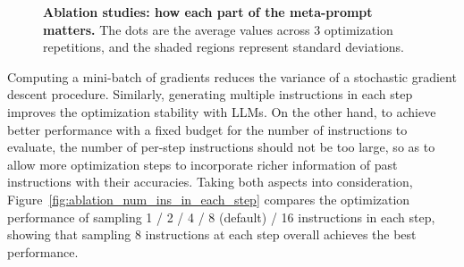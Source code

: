 \begin{figure}
\centering
{}
\hspace{.01\linewidth}

\hspace{.01\linewidth}

\hspace{.01\linewidth}

\caption{\textbf{Ablation studies: how each part of the meta-prompt matters.} 
The dots are the average values across 3 optimization repetitions, and the shaded regions represent standard deviations.}
\label{fig:ablation_meta_prompt}
\end{figure}

Computing a mini-batch of gradients reduces the variance of a stochastic gradient descent procedure.
Similarly, generating multiple instructions in each step improves the optimization stability with LLMs.
On the other hand, to achieve better performance with a fixed budget for the number of instructions to evaluate, the number of per-step instructions should not be too large, so as to allow more optimization steps to incorporate richer information of past instructions with their accuracies.
Taking both aspects into consideration, Figure~\ref{fig:ablation_num_ins_in_each_step} compares the optimization performance of sampling 1 / 2 / 4 / 8 (default) / 16 instructions in each step, showing that sampling 8 instructions at each step overall achieves the best performance.

